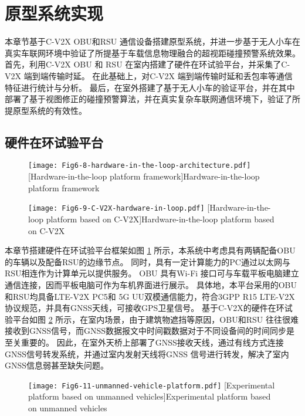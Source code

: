 \section{原型系统实现}\label{section 5-5}

本章节基于C-V2X OBU和RSU 通信设备搭建原型系统，并进一步基于无人小车在真实车联网环境中验证了所提基于车载信息物理融合的超视距碰撞预警系统效果。
首先，利用C-V2X OBU 和 RSU 在室内搭建了硬件在环试验平台，并采集了C-V2X 端到端传输时延。
在此基础上，对C-V2X 端到端传输时延和丢包率等通信特征进行统计与分析。
最后，在室外搭建了基于无人小车的验证平台，并在其中部署了基于视图修正的碰撞预警算法，并在真实复杂车联网通信环境下，验证了所提原型系统的有效性。

\subsection{硬件在环试验平台}

\begin{figure}[h]
\centering
  \texttt{[image: Fig6-8-hardware-in-the-loop-architecture.pdf]}
  [Hardware-in-the-loop platform framework]{Hardware-in-the-loop platform framework}
  \label{fig 5-8}
\end{figure}

\begin{figure}[h]
\centering
  \texttt{[image: Fig6-9-C-V2X-hardware-in-loop.pdf]}
  [Hardware-in-the-loop platform based on C-V2X]{Hardware-in-the-loop platform based on C-V2X}
  \label{fig 5-9}
\end{figure}

本章节搭建硬件在环试验平台框架如图 \ref{fig 5-8} 所示，本系统中考虑具有两辆配备OBU的车辆以及配备RSU的边缘节点。
同时，具有一定计算能力的PC通过以太网与RSU相连作为计算单元以提供服务。
OBU 具有Wi-Fi 接口可与车载平板电脑建立通信连接，因而平板电脑可作为车机界面进行展示。
具体地，本平台采用的OBU和RSU均具备LTE-V2X PC5和 5G UU双模通信能力，符合3GPP R15 LTE-V2X协议规范，并具有GNSS天线，可接收GPS卫星信号。
基于C-V2X的硬件在环试验平台如图 \ref{fig 5-9} 所示，在室内场景，由于建筑物遮挡等原因，OBU和RSU 往往很难接收到GNSS信号，而GNSS数据报文中时间戳数据对于不同设备间的时间同步是至关重要的。
因此，在室外天桥上部署了GNSS接收天线，通过有线方式连接GNSS信号转发系统，并通过室内发射天线将GNSS 信号进行转发，解决了室内GNSS信息弱甚至缺失问题。

\begin{figure}[h]
\centering
  \texttt{[image: Fig6-11-unmanned-vehicle-platform.pdf]}
  [Experimental platform based on unmanned vehicles]{Experimental platform based on unmanned vehicles}
  \label{fig 5-11}
\end{figure}


